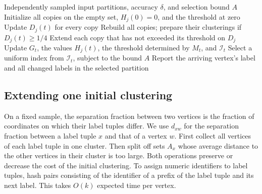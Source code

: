 \documentclass[11pt]{article}
\begin{document}
\begin{algorithm}[htbp]
\caption{Explicit online consensus clustering}
\label{alg:online}
\begin{algorithmic}[1]
\Require Independently sampled input partitions, accuracy $\delta$, and selection bound $A$
\State Initialize all copies on the empty set, $H_j(0)=0$, and the threshold at zero
  \State Update $D_j(t)$ for every copy
    \State Rebuild all copies; prepare their clusterings if $D_j(t)\ge1/4$
  \EndIf
  \State Extend each copy that has not exceeded its threshold on $D_j$
  \State Update $G_t$, the values $H_j(t)$, the threshold determined by $M_t$, and $\mathcal I_t$
    \State Select a uniform index from $\mathcal I_t$, subject to the bound $A$
  \EndIf
  \State Report the arriving vertex's label and all changed labels in the selected partition
\EndFor
\end{algorithmic}
\end{algorithm}

\subsection{Extending one initial clustering}

On a fixed sample, the separation fraction between two vertices is the
fraction of coordinates on which their label tuples differ. We use
$d_{xw}$ for the separation fraction between a label tuple $x$ and that
of a vertex $w$. First collect all vertices of each label tuple in
one cluster. Then split off sets $A_x$ whose average distance to the
other vertices in their cluster is too large. Both operations
preserve or decrease the cost of the initial clustering. To assign numeric identifiers to
label tuples, hash pairs consisting of the identifier of a prefix of the
label tuple and its next label. This takes $O(k)$ expected time per vertex.
\end{document}
